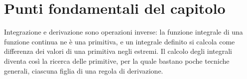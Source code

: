 \section{Punti fondamentali del capitolo}
\label{sec:sintesi-cap09}

Integrazione e derivazione sono operazioni inverse: la funzione integrale di una
funzione continua ne è una primitiva, e un integrale definito si calcola come differenza
dei valori di una primitiva negli estremi. Il calcolo degli integrali diventa così la
ricerca delle primitive, per la quale bastano poche tecniche generali, ciascuna figlia di
una regola di derivazione.

